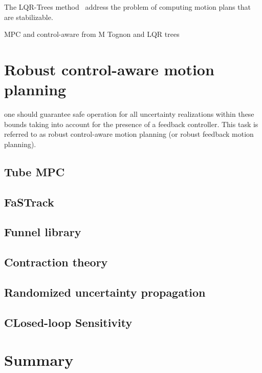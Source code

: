 The LQR-Trees method~\cite{cLQRTrees} address the problem of computing motion plans that are stabilizable.

MPC and control-aware from M Tognon and LQR trees

\section{Robust control-aware motion planning}

one should guarantee safe operation for all uncertainty realizations within these bounds taking into account for the presence of a feedback controller. This task is referred to as robust control-aware motion planning (or robust feedback motion planning).

\subsection{Tube MPC}

\subsection{FaSTrack}

\subsection{Funnel library}

\subsection{Contraction theory}

\subsection{Randomized uncertainty propagation}

\subsection{CLosed-loop Sensitivity}

\section{Summary}